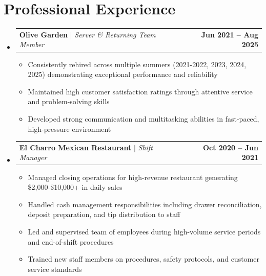 \documentclass[letterpaper,11pt]{article}
\makeatletter
\newcommand{\resumeItem}[1]{
  \item\small{
    {#1 \vspace{-2pt}}
  }
}
\newcommand{\resumeProjectHeading}[2]{
    \item
    \begin{tabular*}{0.99\textwidth}{l@{\extracolsep{\fill}}r}
      \small#1 & \textbf{\small #2}\\
    \end{tabular*}\vspace{-5pt}
}
\newcommand{\resumeSubHeadingListStart}{\begin{itemize}[leftmargin=0.0in, label={}]}
\newcommand{\resumeSubHeadingListEnd}{\end{itemize}}
\newcommand{\resumeItemListStart}{\begin{itemize}}
\newcommand{\resumeItemListEnd}{\end{itemize}\vspace{-3pt}}
\makeatother
\begin{document}
\section{Professional Experience}
    \resumeSubHeadingListStart
        \resumeProjectHeading
            {\textbf{Olive Garden} $|$ \emph{Server \& Returning Team Member}}{Jun 2021 -- Aug 2025}
            \resumeItemListStart
                \resumeItem{Consistently rehired across multiple summers (2021-2022, 2023, 2024, 2025) demonstrating exceptional performance and reliability}
                \resumeItem{Maintained high customer satisfaction ratings through attentive service and problem-solving skills}
                \resumeItem{Developed strong communication and multitasking abilities in fast-paced, high-pressure environment}
            \resumeItemListEnd
            \vspace{-12pt}
        \resumeProjectHeading
            {\textbf{El Charro Mexican Restaurant} $|$ \emph{Shift Manager}}{Oct 2020 -- Jun 2021}
            \resumeItemListStart
                \resumeItem{Managed closing operations for high-revenue restaurant generating \$2,000-\$10,000+ in daily sales}
                \resumeItem{Handled cash management responsibilities including drawer reconciliation, deposit preparation, and tip distribution to staff}
                \resumeItem{Led and supervised team of employees during high-volume service periods and end-of-shift procedures}
                \resumeItem{Trained new staff members on procedures, safety protocols, and customer service standards}
            \resumeItemListEnd
    \resumeSubHeadingListEnd
\end{document}

